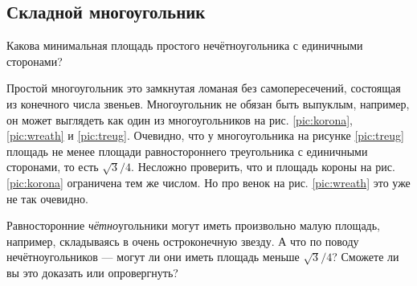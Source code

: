 \subsection*{Складной многоугольник}\label{Сложенный многоугольник}

Какова минимальная площадь простого нечётноугольника с единичными сторонами?

Простой многоугольник это замкнутая ломаная без самопересечений, состоящая из конечного числа звеньев.
Многоугольник не обязан быть выпуклым,
например, он может выглядеть как один из многоугольников на рис. \ref{pic:korona},
\ref{pic:wreath} и \ref{pic:treug}.
Очевидно, что у многоугольника на рисунке \ref{pic:treug} площадь не менее площади равностороннего треугольника с единичными сторонами, то есть $\sqrt{3}/4$.
Несложно проверить, что и площадь короны на рис. \ref{pic:korona} ограничена тем же числом.
Но про венок на рис. \ref{pic:wreath} это уже не так очевидно.

Равносторонние \emph{чётно}угольники могут иметь произвольно малую площадь, например, складываясь в очень остроконечную звезду.
А что по поводу нечётноугольников --- могут ли они иметь площадь меньше $\sqrt{3}/4$?
Сможете ли вы это доказать или опровергнуть?


